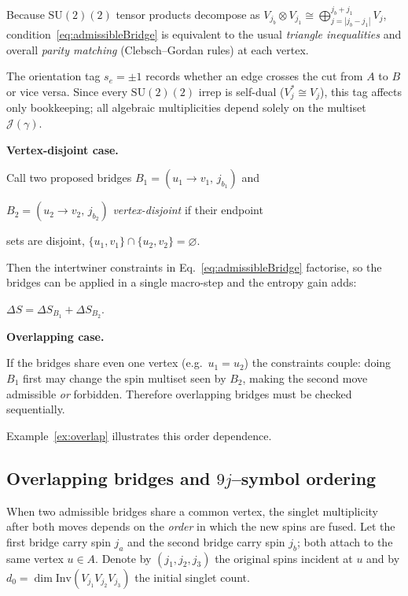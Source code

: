 \documentclass[11pt]{article}
\newcommand{\SU}{\mathrm{SU}(2)}
\newcommand{\Inv}{\mathrm{Inv}}
\newcommand{\Cut}{\gamma}
\newcommand{\JS}{\mathcal{J}} %
\begin{document}
\noindent
Because $\SU(2)$ tensor products decompose as
\(V_{j_b}\otimes V_{j_1}\cong
  \bigoplus_{j=|j_b-j_1|}^{j_b+j_1}V_{j}\),
condition~\eqref{eq:admissibleBridge} is equivalent to the usual
\emph{triangle inequalities} and overall \emph{parity matching}
(Clebsch–Gordan rules) at each vertex.

\begin{remark}\label{rem:orientationBook}
The orientation tag $s_e=\pm1$ records whether an edge crosses the cut
from $A$ to $B$ or vice versa.  Since every $\SU(2)$ irrep is self-dual
($V_j^{*}\!\cong\!V_j$), this tag affects only bookkeeping; all algebraic
multiplicities depend solely on the multiset~$\JS(\Cut)$.
\end{remark}


\begin{remark}\label{rem:simul}

\textbf{Vertex-disjoint case.}

Call two proposed bridges $B_1=(u_1\!\to\! v_1,\,j_{b_1})$ and

$B_2=(u_2\!\to\! v_2,\,j_{b_2})$ \emph{vertex-disjoint} if their endpoint

sets are disjoint, $\{u_1,v_1\}\cap\{u_2,v_2\}=\varnothing$.

Then the intertwiner constraints in Eq.~\eqref{eq:admissibleBridge} factorise,
so the bridges can be applied in a single macro-step and the entropy gain
adds:

$\Delta S=\Delta S_{B_1}+\Delta S_{B_2}$.

\textbf{Overlapping case.}

If the bridges share even one vertex (e.g.\ $u_1=u_2$) the constraints
couple: doing $B_1$ first may change the spin multiset seen by $B_2$,
making the second move admissible \emph{or} forbidden.
Therefore overlapping bridges must be checked sequentially.

Example~\ref{ex:overlap} illustrates this order dependence.

\end{remark}

\subsection{Overlapping bridges and $9j$--symbol ordering}
\label{subsec:overlap9j}

When two admissible bridges share a common vertex, the singlet
multiplicity after both moves depends on the \emph{order} in which the
new spins are fused.  Let the first bridge carry spin $j_a$ and the
second bridge carry spin $j_b$; both attach to the same vertex
$u\in A$.  Denote by $(j_1,j_2,j_3)$ the original spins incident at
$u$ and by $d_0=\dim\Inv(V_{j_1}V_{j_2}V_{j_3})$ the initial singlet
count.
\end{document}
